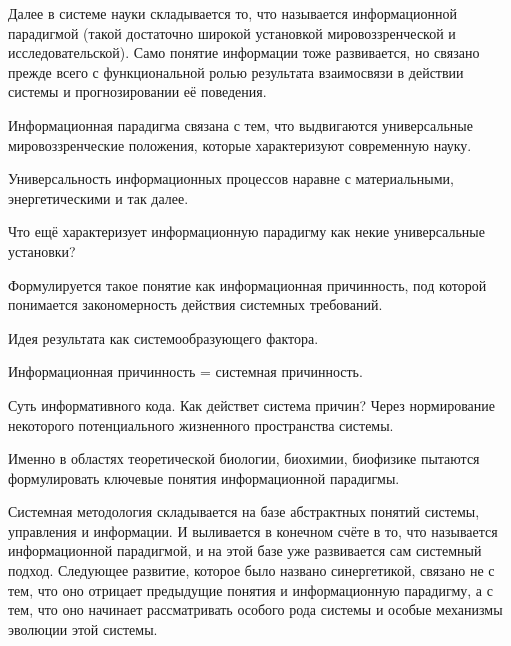 \documentclass[main.tex]{subfiles}
\begin{document}


Далее в системе науки складывается то, что называется информационной парадигмой (такой достаточно широкой установкой мировоззренческой и исследовательской).
Само понятие информации тоже развивается, но связано прежде всего с функциональной ролью результата взаимосвязи в действии системы и прогнозировании её поведения.

Информационная парадигма связана с тем, что выдвигаются универсальные мировоззренческие положения, которые характеризуют современную науку.

Универсальность информационных процессов наравне с материальными, энергетическими и так далее.



Что ещё характеризует информационную парадигму как некие универсальные установки?

Формулируется такое понятие как информационная причинность, под которой понимается закономерность действия системных требований.

Идея результата как системообразующего фактора.

Информационная причинность = системная причинность.

Суть информативного кода.
Как действет система причин?
Через нормирование некоторого потенциального жизненного пространства системы.

Именно в областях теоретической биологии, биохимии, биофизике пытаются формулировать ключевые понятия информационной парадигмы.





Системная методология складывается на базе абстрактных понятий системы, управления и информации.
И выливается в конечном счёте в то, что называется информационной парадигмой, и на этой базе уже развивается сам системный подход.
Следующее развитие, которое было названо синергетикой, связано не с тем, что оно отрицает предыдущие понятия и информационную парадигму, а с тем, что оно начинает рассматривать особого рода системы и особые механизмы эволюции этой системы.
\end{document}
